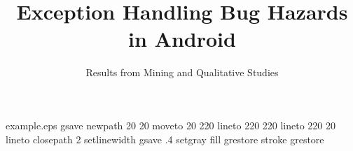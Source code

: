 %
%
%
%
%
\begin{filecontents*}{example.eps}
gsave
newpath
  20 20 moveto
  20 220 lineto
  220 220 lineto
  220 20 lineto
closepath
2 setlinewidth
gsave
  .4 setgray fill
grestore
stroke
grestore
\end{filecontents*}
%
\RequirePackage{fix-cm}
%
\documentclass[smallextended]{svjour3}       %
%
\smartqed  %
%
\usepackage{graphicx}
%
%
%
%
%


\newcommand{\finding}[1]{
\noindent\fbox{%
\begin{minipage}{.97\columnwidth}%
\emph{#1}%
\end{minipage}}
}






\title{Exception Handling Bug Hazards in Android%
}
\subtitle{Results from Mining and Qualitative Studies}


